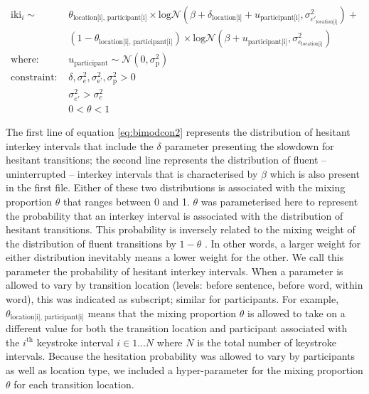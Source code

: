 \documentclass[
  man,floatsintext]{apa7}
\begin{document}
\begin{equation}
\begin{aligned}
\label{eq:bimodcon2}
\text{iki}_{i} \sim\text{ } & \theta_\text{location[i], participant[i]} \times \text{log}\mathcal{N}(\beta + \delta_\text{location[i]} + u_\text{participant[i]}, \sigma_{e'_\text{location[i]}}^2) + \\
  & (1 - \theta_\text{location[i], participant[i]}) \times \text{log}\mathcal{N}(\beta + u_\text{participant[i]}, \sigma_{e_\text{location[i]}}^2)\\
\text{where: } & u_\text{participant} \sim \mathcal{N}(0, \sigma_\text{p}^2) \\
\text{constraint: } & \delta, \sigma_{e}^2, \sigma_\text{e'}^2, \sigma_\text{p}^2>0\\
        & \sigma_{e'}^2 > \sigma_{e}^2\\
        & 0 < \theta < 1
\end{aligned}
\end{equation}

The first line of equation \ref{eq:bimodcon2} represents the distribution of hesitant interkey intervals that include the \(\delta\) parameter presenting the slowdown for hesitant transitions; the second line represents the distribution of fluent -- uninterrupted -- interkey intervals that is characterised by \(\beta\) which is also present in the first file. Either of these two distributions is associated with the mixing proportion \(\theta\) that ranges between 0 and 1. \(\theta\) was parameterised here to represent the probability that an interkey interval is associated with the distribution of hesitant transitions. This probability is inversely related to the mixing weight of the distribution of fluent transitions by \(1-\theta\) . In other words, a larger weight for either distribution inevitably means a lower weight for the other. We call this parameter the probability of hesitant interkey intervals. When a parameter is allowed to vary by transition location (levels: before sentence, before word, within word), this was indicated as subscript; similar for participants. For example, \(\theta_\text{location[i], participant[i]}\) means that the mixing proportion \(\theta\) is allowed to take on a different value for both the transition location and participant associated with the \(i^\text{th}\) keystroke interval \(i \in 1 \ldots N\) where \(N\) is the total number of keystroke intervals. Because the hesitation probability was allowed to vary by participants as well as location type, we included a hyper-parameter for the mixing proportion \(\theta\) for each transition location.
\end{document}
